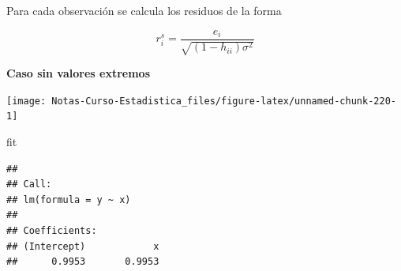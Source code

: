 \documentclass[
  12pt,
]{book}
\newenvironment{Shaded}{\begin{snugshade}}{\end{snugshade}}
\newcommand{\DataTypeTok}[1]{\textcolor[rgb]{0.13,0.29,0.53}{#1}}
\newcommand{\DecValTok}[1]{\textcolor[rgb]{0.00,0.00,0.81}{#1}}
\newcommand{\FloatTok}[1]{\textcolor[rgb]{0.00,0.00,0.81}{#1}}
\newcommand{\KeywordTok}[1]{\textcolor[rgb]{0.13,0.29,0.53}{\textbf{#1}}}
\newcommand{\NormalTok}[1]{#1}
\newcommand{\OperatorTok}[1]{\textcolor[rgb]{0.81,0.36,0.00}{\textbf{#1}}}
\newcommand{\StringTok}[1]{\textcolor[rgb]{0.31,0.60,0.02}{#1}}
\theoremstyle{definition}
\theoremstyle{definition}
\theoremstyle{definition}
\theoremstyle{remark}
\begin{document}
Para cada observación se calcula los residuos de la forma

\begin{equation*}
r_{i}^{s} = \frac{e_i}{\sqrt{(1-h_{ii}) \sigma^{2}}}
\end{equation*}

\textbf{Caso sin valores extremos}

\begin{Shaded}
\end{Shaded}

\begin{center}\texttt{[image: Notas-Curso-Estadistica\_files/figure-latex/unnamed-chunk-220-1]} \end{center}

\begin{Shaded}
\begin{Highlighting}[]
\NormalTok{fit}
\end{Highlighting}
\end{Shaded}

\begin{verbatim}
## 
## Call:
## lm(formula = y ~ x)
## 
## Coefficients:
## (Intercept)            x  
##      0.9953       0.9953
\end{verbatim}
\end{document}

